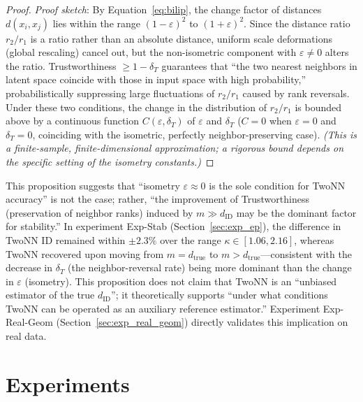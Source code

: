 \documentclass[make,article,submit,pdftex,moreauthors]{Definitions/mdpi}
\newcommand{\kap}{\kappa}
\begin{document}
\begin{proof}
\textit{Proof sketch}:
By Equation~\eqref{eq:bilip}, the change factor of distances $d(x_i, x_j)$ lies within
the range $(1-\varepsilon)^2$ to $(1+\varepsilon)^2$.
Since the distance ratio $r_2/r_1$ is a ratio rather than an absolute distance, uniform
scale deformations (global rescaling) cancel out, but the non-isometric component with
$\varepsilon \neq 0$ alters the ratio.
Trustworthiness $\geq 1-\delta_T$ guarantees that ``the two nearest neighbors in latent
space coincide with those in input space with high probability,'' probabilistically
suppressing large fluctuations of $r_2/r_1$ caused by rank reversals.
Under these two conditions, the change in the distribution of $r_2/r_1$ is bounded above
by a continuous function $C(\varepsilon,\delta_T)$ of $\varepsilon$ and $\delta_T$
($C=0$ when $\varepsilon=0$ and $\delta_T=0$, coinciding with the isometric,
perfectly neighbor-preserving case).
\textit{(This is a finite-sample, finite-dimensional approximation; a rigorous bound
depends on the specific setting of the isometry constants.)}
\end{proof}

\begin{Remark}
This proposition suggests that ``isometry $\varepsilon \approx 0$ is the sole condition
for TwoNN accuracy'' is not the case; rather, ``the improvement of Trustworthiness
(preservation of neighbor ranks) induced by $m \gg d_\mathrm{ID}$ may be the dominant
factor for stability.''
In experiment Exp-Stab (Section~\ref{sec:exp_ep}), the difference in TwoNN ID remained
within $\pm 2.3\%$ over the range $\kap \in [1.06, 2.16]$, whereas TwoNN recovered upon
moving from $m = d_\mathrm{true}$ to $m > d_\mathrm{true}$---consistent with the
decrease in $\delta_T$ (the neighbor-reversal rate) being more dominant than the change
in $\varepsilon$ (isometry).
This proposition does not claim that TwoNN is an ``unbiased estimator of the true
$d_\mathrm{ID}$''; it theoretically supports ``under what conditions TwoNN can be operated
as an auxiliary reference estimator.''
Experiment Exp-Real-Geom (Section~\ref{sec:exp_real_geom}) directly validates this
implication on real data.
\end{Remark}

\section{Experiments}\label{sec:exp}
\end{document}
